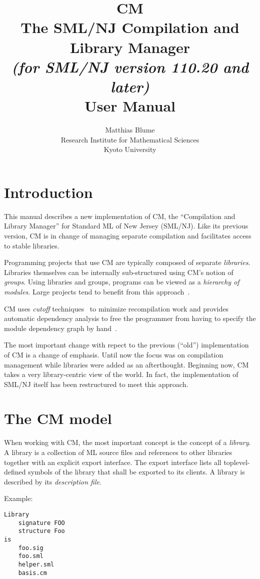 \documentclass{article}
\author{Matthias Blume \\
Research Institute for Mathematical Sciences \\
Kyoto University}
\title{{\bf CM}\\
The SML/NJ Compilation and Library Manager \\
{\it\small (for SML/NJ version 110.20 and later)} \\
User Manual}
\begin{document}


\maketitle

\section{Introduction}

This manual describes a new implementation of CM, the ``Compilation
and Library Manager'' for Standard ML of New Jersey (SML/NJ).  Like its
previous version, CM is in change of managing separate compilation and
facilitates access to stable libraries.

Programming projects that use CM are typically composed of separate
{\em libraries}.  Libraries themselves can be internally
sub-structured using CM's notion of {\em groups}.  Using libraries and
groups, programs can be viewed as a {\em hierarchy of modules}.  Large
projects tend to benefit from this approach~\cite{blume:appel:cm99}.

CM uses {\em cutoff} techniques~\cite{tichy94} to minimize
recompilation work and provides automatic dependency analysis to free
the programmer from having to specify the module dependency graph by
hand~\cite{blume:depend99}.

The most important change with repect to the previous (``old'')
implementation of CM is a change of emphasis.  Until now the focus was
on compilation management while libraries were added as an
afterthought.  Beginning now, CM takes a very library-centric view of
the world.  In fact, the implementation of SML/NJ itself has been
restructured to meet this approach.

\section{The CM model}

When working with CM, the most important concept is the concept of a
{\em library}.  A library is a collection of ML source files and
references to other libraries together with an explicit export
interface.  The export interface lists all toplevel-defined symbols of
the library that shall be exported to its clients.  A library is
described by its {\em description file}.

\noindent Example:

\begin{verbatim}
Library
    signature FOO
    structure Foo
is
    foo.sig
    foo.sml
    helper.sml
    basis.cm
\end{verbatim}
\end{document}
